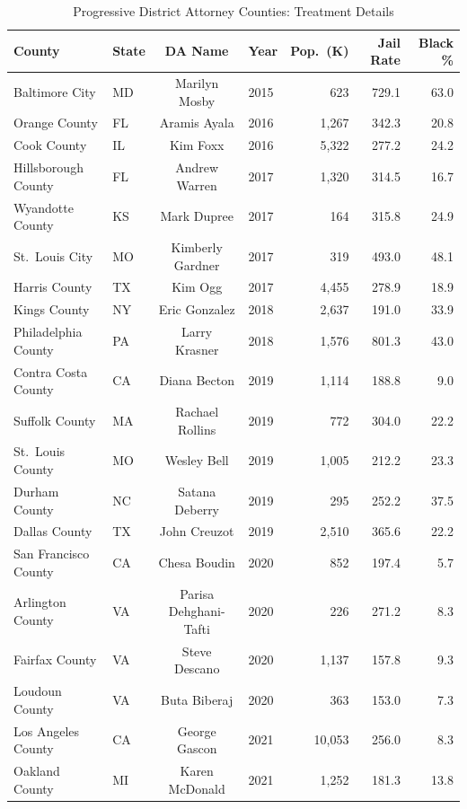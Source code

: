 \documentclass[12pt]{article}
\begin{document}
\begin{table}[H]
\centering
\caption{Progressive District Attorney Counties: Treatment Details}
\label{tab:treatment_details}
\begin{threeparttable}
\small
\begin{tabular}{llclrrr}
\toprule
County & State & DA Name & Year & Pop.\ (K) & Jail Rate & Black \% \\
\midrule
Baltimore City & MD & Marilyn Mosby & 2015 & 623 & 729.1 & 63.0 \\
Orange County & FL & Aramis Ayala & 2016 & 1,267 & 342.3 & 20.8 \\
Cook County & IL & Kim Foxx & 2016 & 5,322 & 277.2 & 24.2 \\
Hillsborough County & FL & Andrew Warren & 2017 & 1,320 & 314.5 & 16.7 \\
Wyandotte County & KS & Mark Dupree & 2017 & 164 & 315.8 & 24.9 \\
St.\ Louis City & MO & Kimberly Gardner & 2017 & 319 & 493.0 & 48.1 \\
Harris County & TX & Kim Ogg & 2017 & 4,455 & 278.9 & 18.9 \\
Kings County & NY & Eric Gonzalez & 2018 & 2,637 & 191.0 & 33.9 \\
Philadelphia County & PA & Larry Krasner & 2018 & 1,576 & 801.3 & 43.0 \\
Contra Costa County & CA & Diana Becton & 2019 & 1,114 & 188.8 & 9.0 \\
Suffolk County & MA & Rachael Rollins & 2019 & 772 & 304.0 & 22.2 \\
St.\ Louis County & MO & Wesley Bell & 2019 & 1,005 & 212.2 & 23.3 \\
Durham County & NC & Satana Deberry & 2019 & 295 & 252.2 & 37.5 \\
Dallas County & TX & John Creuzot & 2019 & 2,510 & 365.6 & 22.2 \\
San Francisco County & CA & Chesa Boudin & 2020 & 852 & 197.4 & 5.7 \\
Arlington County & VA & Parisa Dehghani-Tafti & 2020 & 226 & 271.2 & 8.3 \\
Fairfax County & VA & Steve Descano & 2020 & 1,137 & 157.8 & 9.3 \\
Loudoun County & VA & Buta Biberaj & 2020 & 363 & 153.0 & 7.3 \\
Los Angeles County & CA & George Gascon & 2021 & 10,053 & 256.0 & 8.3 \\
Oakland County & MI & Karen McDonald & 2021 & 1,252 & 181.3 & 13.8 \\

\end{tabular}
\end{threeparttable}
\end{table}
\end{document}
